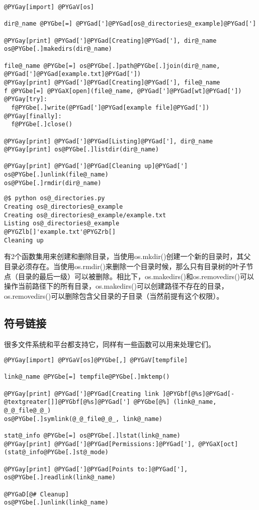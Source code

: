 \documentclass[a4paper,10pt,english]{manual}
\begin{document}
\begin{Verbatim}[commandchars=@\[\]]
@PYGay[import] @PYGaV[os]

dir@_name @PYGbe[=] @PYGad[']@PYGad[os@_directories@_example]@PYGad[']

@PYGay[print] @PYGad[']@PYGad[Creating]@PYGad['], dir@_name
os@PYGbe[.]makedirs(dir@_name)

file@_name @PYGbe[=] os@PYGbe[.]path@PYGbe[.]join(dir@_name, @PYGad[']@PYGad[example.txt]@PYGad['])
@PYGay[print] @PYGad[']@PYGad[Creating]@PYGad['], file@_name
f @PYGbe[=] @PYGaX[open](file@_name, @PYGad[']@PYGad[wt]@PYGad['])
@PYGay[try]:
  f@PYGbe[.]write(@PYGad[']@PYGad[example file]@PYGad['])
@PYGay[finally]:
  f@PYGbe[.]close()

@PYGay[print] @PYGad[']@PYGad[Listing]@PYGad['], dir@_name
@PYGay[print] os@PYGbe[.]listdir(dir@_name)

@PYGay[print] @PYGad[']@PYGad[Cleaning up]@PYGad[']
os@PYGbe[.]unlink(file@_name)
os@PYGbe[.]rmdir(dir@_name)
\end{Verbatim}

\begin{Verbatim}[commandchars=@\[\]]
@$ python os@_directories.py
Creating os@_directories@_example
Creating os@_directories@_example/example.txt
Listing os@_directories@_example
@PYGZlb[]'example.txt'@PYGZrb[]
Cleaning up
\end{Verbatim}

有2个函数集用来创建和删除目录，当使用os.mkdir()创建一个新的目录时，其父目录必须存在。当使用os.rmdir()来删除一个目录时候，那么只有目录树的叶子节点（目录的最后一级）可以被删除。相比下，os.makedirs()和os.removedirs()可以操作当前路径下的所有目录，os.makedirs()可以创建路径不存在的目录，os.removedirs()可以删除包含父目录的子目录（当然前提有这个权限）。


\subsection{符号链接}

很多文件系统和平台都支持它，同样有一些函数可以用来处理它们。

\begin{Verbatim}[commandchars=@\[\]]
@PYGay[import] @PYGaV[os]@PYGbe[,] @PYGaV[tempfile]

link@_name @PYGbe[=] tempfile@PYGbe[.]mktemp()

@PYGay[print] @PYGad[']@PYGad[Creating link ]@PYGbf[@%s]@PYGad[-@textgreater[]]@PYGbf[@%s]@PYGad['] @PYGbe[@%] (link@_name, @_@_file@_@_)
os@PYGbe[.]symlink(@_@_file@_@_, link@_name)

stat@_info @PYGbe[=] os@PYGbe[.]lstat(link@_name)
@PYGay[print] @PYGad[']@PYGad[Permissions:]@PYGad['], @PYGaX[oct](stat@_info@PYGbe[.]st@_mode)

@PYGay[print] @PYGad[']@PYGad[Points to:]@PYGad['], os@PYGbe[.]readlink(link@_name)

@PYGaD[@# Cleanup]
os@PYGbe[.]unlink(link@_name)
\end{Verbatim}
\end{document}
